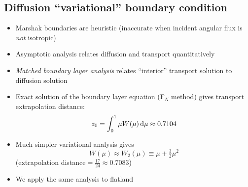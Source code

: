 \documentclass{beamer}
\begin{document}
\subsection{Diffusion ``variational'' boundary condition}
\begin{frame}
  \begin{itemize}
    \item Marshak boundaries are heuristic (inaccurate when incident angular
      flux is \emph{not} isotropic)
    \item Asymptotic analysis relates diffusion and transport quantitatively
    \item \emph{Matched boundary layer analysis} relates ``interior'' transport
      solution to diffusion solution
    \item Exact solution of the boundary layer equation (F$_N$ method)
      gives transport extrapolation distance:
      \begin{equation*}
        z_0 = \int_{0}^{1} \mu W(\mu) \mathop{}\!\mathrm{d}\mu
        \approx 0.7104
      \end{equation*}
    \item Much simpler variational analysis \cite{Mal1991} gives
      \begin{equation*}
        W(\mu) \approx  W_2(\mu) \equiv \mu + \tfrac{3}{2} \mu^2  
      \end{equation*}
      (extrapolation distance${}= \tfrac{17}{24}
      \approx 0.7083$)
    \item We apply the same analysis to flatland
  \end{itemize}
\end{frame}
\end{document}
